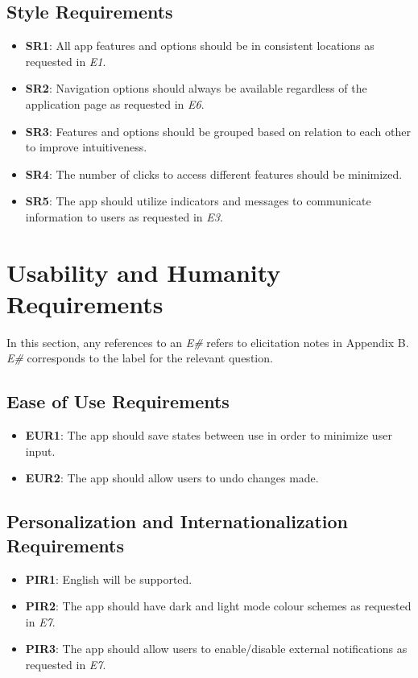 \documentclass[12pt]{article}
\begin{document}
\subsection{Style Requirements}
\begin{itemize}
  \item \textbf{SR1}: All app features and options should be in consistent locations as requested in \textit{E1}.
  \item \textbf{SR2}: Navigation options should always be available regardless of the application page as requested in \textit{E6}.
  \item \textbf{SR3}: Features and options should be grouped based on relation to each other to improve intuitiveness.
  \item \textbf{SR4}: The number of clicks to access different features should be minimized.
  \item \textbf{SR5}: The app should utilize indicators and messages to communicate information to users as requested in \textit{E3}.
\end{itemize}

\section{Usability and Humanity Requirements}
In this section, any references to an \textit{E\#} refers to elicitation notes in Appendix B. \textit{E\#} corresponds
to the label for the relevant question.

\subsection{Ease of Use Requirements}
\begin{itemize}
  \item \textbf{EUR1}: The app should save states between use in order to minimize user input.
  \item \textbf{EUR2}: The app should allow users to undo changes made.
\end{itemize}
\subsection{Personalization and Internationalization Requirements}
\begin{itemize}
  \item \textbf{PIR1}: English will be supported.
  \item \textbf{PIR2}: The app should have dark and light mode colour schemes as requested in \textit{E7}.
  \item \textbf{PIR3}: The app should allow users to enable/disable external notifications as requested in \textit{E7}.
\end{itemize}
\end{document}

